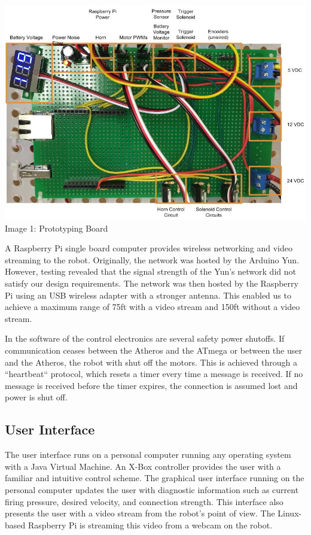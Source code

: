 \documentclass[letterpaper,12pt]{article}
\begin{document}
\begin{center}
    \includegraphics[width=15cm]{./pics/electronics/AnnotatedProtoboard.jpg}\\
     Image 1: Prototyping Board
\end{center}

A Raspberry Pi single board computer provides wireless networking and video 
streaming to the robot. Originally, the network was hosted by the Arduino Yun. 
However, testing revealed that the signal strength of the Yun's network did not satisfy 
our design requirements.  The network was then hosted by the Raspberry Pi using 
an USB wireless adapter with a stronger antenna. This enabled us to achieve a maximum 
range of 75ft with a video stream and 150ft without a video stream.

In the software of the control electronics are several safety power shutoffs.
If communication ceases between the Atheros and the ATmega or between the user
and the Atheros, the robot with shut off the motors. This is achieved through
a “heartbeat“ protocol, which resets a timer every time a message is received.
If no message is received before the timer expires, the connection is assumed
lost and power is shut off.\\

\subsection{User Interface}
The user interface runs on a personal computer running any operating system
with a Java Virtual Machine. An X-Box controller provides the user with
a familiar and intuitive control scheme. The graphical user interface running
on the personal computer updates the user with diagnostic information such as
current firing pressure, desired velocity, and connection strength. This
interface also presents the user with a video stream from the robot’s point of
view. The Linux-based Raspberry Pi is streaming this
video from a webcam on the robot.\\
\end{document}
